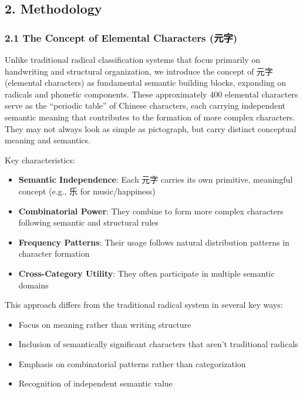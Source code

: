 \documentclass[
  11pt,
  letterpaper,
]{article}
\providecommand{\tightlist}{%
  \setlength{\itemsep}{0pt}\setlength{\parskip}{0pt}}
\begin{document}
\subsection{2. Methodology}\label{methodology}

\subsubsection{2.1 The Concept of Elemental Characters
(元字)}\label{the-concept-of-elemental-characters-ux5143ux5b57}

Unlike traditional radical classification systems that focus primarily
on handwriting and structural organization, we introduce the concept of
元字 (elemental characters) as fundamental semantic building blocks,
expanding on radicals and phonetic components. These approximately 400
elemental characters serve as the ``periodic table'' of Chinese
characters, each carrying independent semantic meaning that contributes
to the formation of more complex characters. They may not always look as
simple as pictograph, but carry distinct conceptual meaning and
semantics.

Key characteristics:

\begin{itemize}
\tightlist
\item
  \textbf{Semantic Independence}: Each 元字 carries its own primitive,
  meaningful concept (e.g., 乐 for music/happiness)
\item
  \textbf{Combinatorial Power}: They combine to form more complex
  characters following semantic and structural rules
\item
  \textbf{Frequency Patterns}: Their usage follows natural distribution
  patterns in character formation
\item
  \textbf{Cross-Category Utility}: They often participate in multiple
  semantic domains
\end{itemize}

This approach differs from the traditional radical system in several key
ways:

\begin{itemize}
\tightlist
\item
  Focus on meaning rather than writing structure
\item
  Inclusion of semantically significant characters that aren't
  traditional radicals
\item
  Emphasis on combinatorial patterns rather than categorization
\item
  Recognition of independent semantic value
\end{itemize}
\end{document}
